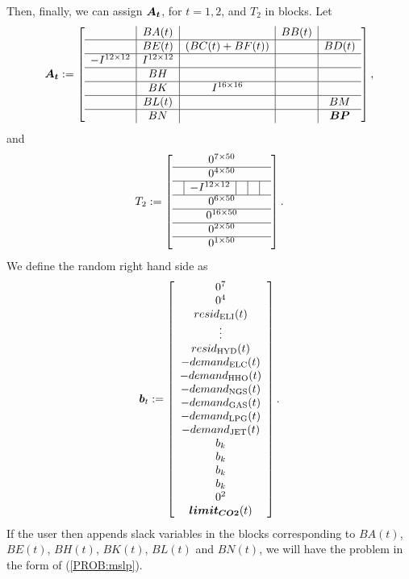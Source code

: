 Then, finally, we can assign $\mathbf{\boldsymbol{A_t}}$, for $t=1,2$, and $T_2$ in blocks.  Let
\[
\mathbf{\boldsymbol{A_t}}:= \left[\begin{array}{c|c|c|c|c}
& BA(t) & &BB(t)&\\ \hline
& BE(t) & (BC(t)+BF(t)) & & BD(t)\\ \hline
-I^{12\times 12} & I^{12\times 12} & & &\\ \hline
& BH & & &\\ \hline
&BK&I^{16\times 16}& &\\ \hline
&BL(t) & & &BM\\ \hline
&BN & & &\mathbf{\boldsymbol{BP}}
\end{array}
\right],
\]
and 
\[
T_2\assign\left[\begin{array}{c|c|c|c|c}
\multicolumn{5}{c}{0^{7\times 50}}\\ \hline
\multicolumn{5}{c}{0^{4\times 50}}\\ \hline
& -I^{12\times 12} & & &\\ \hline
\multicolumn{5}{c}{0^{6\times 50}}\\ \hline
\multicolumn{5}{c}{0^{16\times 50}}\\ \hline
\multicolumn{5}{c}{0^{2\times 50}}\\ \hline
\multicolumn{5}{c}{0^{1\times 50}}\end{array}\right].
\]
We define the random right hand side as
\[
\mathbf{\boldsymbol{b}}_t:=\left[\begin{array}{c}
0^7\\
0^4\\
resid_{\text{ELI}}(t)\\
\vdots\\
resid_{\text{HYD}}(t)\\
-demand_{\text{ELC}}(t)\\
-demand_{\text{HHO}}(t)\\
-demand_{\text{NGS}}(t)\\
-demand_{\text{GAS}}(t)\\
-demand_{\text{LPG}}(t)\\
-demand_{\text{JET}}(t)\\
b_k\\
b_k\\
b_k\\
b_k\\
0^2\\
\mathbf{\boldsymbol{limit_{CO2}}}(t)\end{array}\right].
\]
If the user then appends slack variables in the blocks corresponding to $BA(t)$, $BE(t)$, $BH(t)$, $BK(t)$, $BL(t)$ and $BN(t)$, we will have the problem in the form of (\ref{PROB:mslp}).

